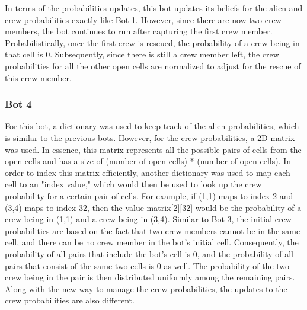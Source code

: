 \documentclass[11pt]{article}
\begin{document}
\medskip

In terms of the probabilities updates, this bot updates its beliefs for the alien and crew probabilities exactly like Bot 1. However, since there are now two crew members, the bot continues to run after capturing the first crew member. Probabilistically, once the first crew is rescued, the probability of a crew being in that cell is 0. Subsequently, since there is still a crew member left, the crew probabilities for all the other open cells are normalized to adjust for the rescue of this crew member. 

\subsubsection{Bot 4}
For this bot, a dictionary was used to keep track of the alien probabilities, which is similar to the previous bots. However, for the crew probabilities, a 2D matrix was used. In essence, this matrix represents all the possible pairs of cells from the open cells and has a size of (number of open cells) * (number of open cells). In order to index this matrix efficiently, another dictionary was used to map each cell to an "index value," which would then be used to look up the crew probability for a certain pair of cells. For example, if (1,1) maps to index 2 and (3,4) maps to index 32, then the value matrix[2][32] would be the probability of a crew being in (1,1) and a crew being in (3,4). Similar to Bot 3, the initial crew probabilities are based on the fact that two crew members cannot be in the same cell, and there can be no crew member in the bot's initial cell. Consequently, the probability of all pairs that include the bot's cell is 0, and the probability of all pairs that consist of the same two cells is 0 as well. The probability of the two crew being in the pair is then distributed uniformly among the remaining pairs. Along with the new way to manage the crew probabilities, the updates to the crew probabilities are also different. 

\medskip
\end{document}

